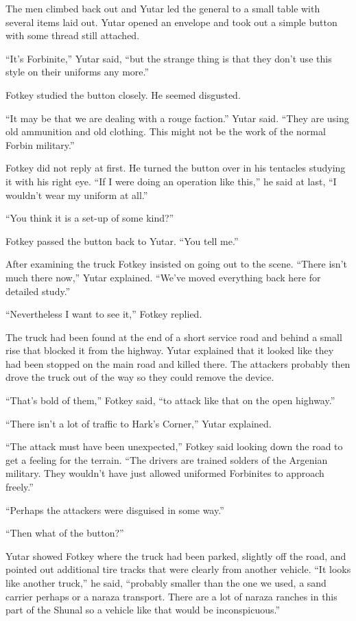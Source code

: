 The men climbed back out and Yutar led the general to a small table with several items laid out.
Yutar opened an envelope and took out a simple button with some thread still attached.

``It's Forbinite,'' Yutar said, ``but the strange thing is that they don't use this style on
their uniforms any more.''

Fotkey studied the button closely. He seemed disgusted.

``It may be that we are dealing with a rouge faction.'' Yutar said. ``They are using old
ammunition and old clothing. This might not be the work of the normal Forbin military.''

Fotkey did not reply at first. He turned the button over in his tentacles studying it with his
right eye. ``If I were doing an operation like this,'' he said at last, ``I wouldn't wear my
uniform at all.''

``You think it is a set-up of some kind?''

Fotkey passed the button back to Yutar. ``You tell me.''

After examining the truck Fotkey insisted on going out to the scene. ``There isn't much there
now,'' Yutar explained. ``We've moved everything back here for detailed study.''

``Nevertheless I want to see it,'' Fotkey replied.

The truck had been found at the end of a short service road and behind a small rise that blocked
it from the highway. Yutar explained that it looked like they had been stopped on the main road
and killed there. The attackers probably then drove the truck out of the way so they could
remove the device.

``That's bold of them,'' Fotkey said, ``to attack like that on the open highway.''

``There isn't a lot of traffic to Hark's Corner,'' Yutar explained.

``The attack must have been unexpected,'' Fotkey said looking down the road to get a feeling for
the terrain. ``The drivers are trained solders of the Argenian military. They wouldn't have just
allowed uniformed Forbinites to approach freely.''

``Perhaps the attackers were disguised in some way.''

``Then what of the button?''

Yutar showed Fotkey where the truck had been parked, slightly off the road, and pointed out
additional tire tracks that were clearly from another vehicle. ``It looks like another truck,''
he said, ``probably smaller than the one we used, a sand carrier perhaps or a naraza transport.
There are a lot of naraza ranches in this part of the Shunal so a vehicle like that would be
inconspicuous.''

